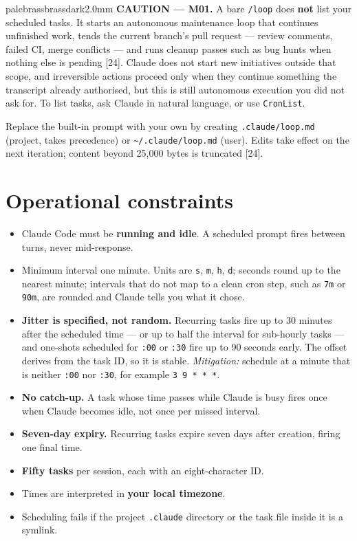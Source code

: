 \documentclass[11pt,a4paper,twoside,openany]{book}
\begin{document}
\begin{calloutbox}{palebrass}{brassdark}{2.0mm}
\textbf{CAUTION — M01.} A bare \texttt{/\allowbreak{}loop} does \textbf{not} list your scheduled tasks. It starts an autonomous maintenance loop that continues unfinished work, tends the current branch's pull request — review comments, failed CI, merge conflicts — and runs cleanup passes such as bug hunts when nothing else is pending [24]. Claude does not start new initiatives outside that scope, and irreversible actions proceed only when they continue something the transcript already authorised, but this is still autonomous execution you did not ask for. To list tasks, ask Claude in natural language, or use \texttt{Cron\allowbreak{}List}.
\end{calloutbox}

Replace the built-in prompt with your own by creating \texttt{.\allowbreak{}claude/\allowbreak{}loop.\allowbreak{}md} (project, takes precedence) or \texttt{\textasciitilde{}/\allowbreak{}.\allowbreak{}claude/\allowbreak{}loop.\allowbreak{}md} (user). Edits take effect on the next iteration; content beyond 25,000 bytes is truncated [24].


\FloatBarrier
\setcounter{section}{1}
\section{Operational constraints}

\begin{itemize}
\item Claude Code must be \textbf{running and idle}. A scheduled prompt fires between turns, never mid-response.
\item Minimum interval one minute. Units are \texttt{s}, \texttt{m}, \texttt{h}, \texttt{d}; seconds round up to the nearest minute; intervals that do not map to a clean cron step, such as \texttt{7m} or \texttt{90m}, are rounded and Claude tells you what it chose.
\item \textbf{Jitter is specified, not random.} Recurring tasks fire up to 30 minutes after the scheduled time — or up to half the interval for sub-hourly tasks — and one-shots scheduled for \texttt{:\allowbreak{}00} or \texttt{:\allowbreak{}30} fire up to 90 seconds early. The offset derives from the task ID, so it is stable. \emph{Mitigation:} schedule at a minute that is neither \texttt{:\allowbreak{}00} nor \texttt{:\allowbreak{}30}, for example \texttt{3 9 * * *}.
\item \textbf{No catch-up.} A task whose time passes while Claude is busy fires once when Claude becomes idle, not once per missed interval.
\item \textbf{Seven-day expiry.} Recurring tasks expire seven days after creation, firing one final time.
\item \textbf{Fifty tasks} per session, each with an eight-character ID.
\item Times are interpreted in \textbf{your local timezone}.
\item Scheduling fails if the project \texttt{.\allowbreak{}claude} directory or the task file inside it is a symlink.
\end{itemize}
\end{document}
